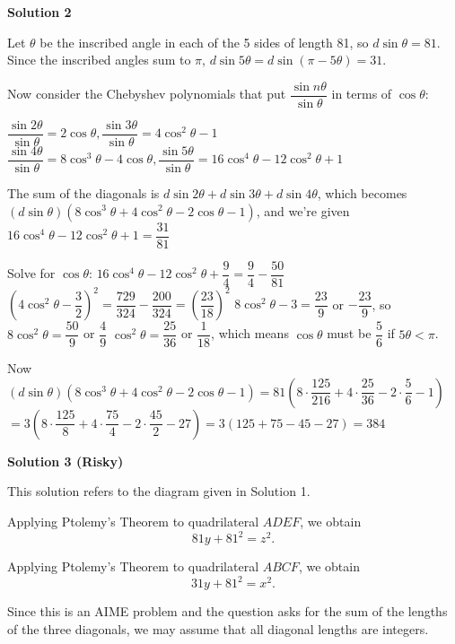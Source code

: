 \begin{enumerate}
 



\textbf{Solution 2}

Let $\theta$ be the inscribed angle in each of the 5 sides of length 81, so $d \sin \theta = 81$. Since the inscribed angles sum to $\pi$, $d \sin 5\theta = d \sin (\pi - 5\theta) = 31$.

 Now consider the Chebyshev polynomials that put $\dfrac{\sin n\theta}{\sin \theta}$ in terms of $\cos \theta$:

 $\dfrac{\sin 2\theta}{\sin \theta} = 2 \cos \theta, \dfrac{\sin 3\theta}{\sin \theta} = 4 \cos^2 \theta - 1$
$\dfrac{\sin 4\theta}{\sin \theta} = 8 \cos^3 \theta - 4 \cos \theta, \dfrac{\sin 5\theta}{\sin \theta} = 16 \cos^4 \theta - 12 \cos^2 \theta + 1$

 The sum of the diagonals is $d\sin 2\theta + d\sin 3\theta + d\sin 4\theta$, which becomes $(d \sin \theta)(8\cos^3 \theta + 4\cos^2 \theta - 2\cos \theta - 1)$, and we're given $16 \cos^4 \theta - 12 \cos^2 \theta + 1 = \dfrac{31}{81}$

 Solve for $\cos \theta$: $16 \cos^4 \theta - 12 \cos^2 \theta + \dfrac{9}{4} = \dfrac{9}{4} - \dfrac{50}{81}$
$\left(4 \cos^2 \theta - \dfrac{3}{2}\right)^2 = \dfrac{729}{324} - \dfrac{200}{324} = \left(\dfrac{23}{18}\right)^2$
$8 \cos^2 \theta - 3 = \dfrac{23}{9}$ or $-\dfrac{23}{9}$, so $8 \cos^2 \theta = \dfrac{50}{9}$ or $\dfrac{4}{9}$
$\cos^2 \theta = \dfrac{25}{36}$ or $\dfrac{1}{18}$, which means $\cos \theta$ must be $\dfrac{5}{6}$ if $5 \theta < \pi$.

 Now $(d \sin \theta)\left(8\cos^3 \theta + 4\cos^2 \theta - 2\cos \theta - 1\right) = 81\left(8 \cdot \dfrac{125}{216} + 4 \cdot \dfrac{25}{36} - 2 \cdot \dfrac{5}{6} - 1\right)$
$= 3 \left(8 \cdot \dfrac{125}{8} + 4 \cdot \dfrac{75}{4} - 2 \cdot \dfrac{45}{2} - 27\right) = 3(125 + 75 - 45 - 27) = \boxed{384}$




\textbf{Solution 3 (Risky)}

This solution refers to the diagram given in Solution 1.

 Applying Ptolemy’s Theorem to quadrilateral \(ADEF\), we obtain
 \[81y + 81^2 = z^2.\]

 Applying Ptolemy’s Theorem to quadrilateral \(ABCF\), we obtain
 \[31y + 81^2 = x^2.\]

 Since this is an AIME problem and the question asks for the sum of the lengths of the three diagonals, we may assume that all diagonal lengths are integers.


\end{enumerate}
